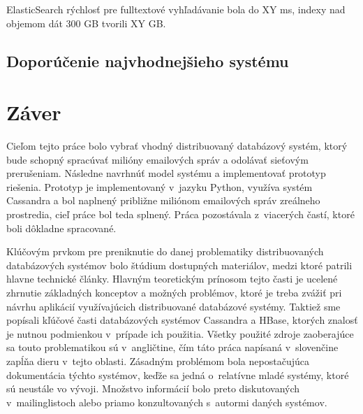 \documentclass[11pt,twoside,a4paper]{book}
\begin{document}
\noindent
ElasticSearch rýchlosť pre fulltextové vyhľadávanie bola do XY ms, indexy nad objemom dát 300 GB tvorili XY GB.

\section{Doporúčenie najvhodnejšieho systému}



\chapter{Záver}


Cieľom tejto práce bolo vybrať vhodný distribuovaný databázový systém, ktorý bude schopný spracúvať milióny emailových správ a odolávať sieťovým prerušeniam. Následne navrhnúť model systému a implementovať prototyp riešenia. Prototyp je implementovaný v~jazyku Python, využíva systém Cassandra a bol naplnený približne miliónom emailových správ zreálneho prostredia, cieľ práce bol teda splnený. Práca pozostávala z~viacerých častí, ktoré boli dôkladne spracované.

Klúčovým prvkom pre preniknutie do danej problematiky distribuovaných databázových systémov bolo štúdium dostupných materiálov, medzi ktoré patrili hlavne technické články. Hlavným teoretickým prínosom tejto časti je ucelené zhrnutie základných konceptov a možných problémov, ktoré je treba zvážiť pri návrhu aplikácií využívajúcich distribuované databázové systémy. Taktiež sme popísali kľúčové časti databázových systémov Cassandra a HBase, ktorých znalosť je nutnou podmienkou v~prípade ich použitia. Všetky použité zdroje zaoberajúce sa touto problematikou sú v~angličtine, čím táto práca napísaná v~slovenčine zapĺňa dieru v~tejto oblasti. Zásadným problémom bola nepostačujúca dokumentácia týchto systémov, keďže sa jedná o~relatívne mladé systémy, ktoré sú neustále vo vývoji. Množstvo informácií bolo preto diskutovaných v~mailinglistoch alebo priamo konzultovaných s~autormi daných systémov.
\end{document}
